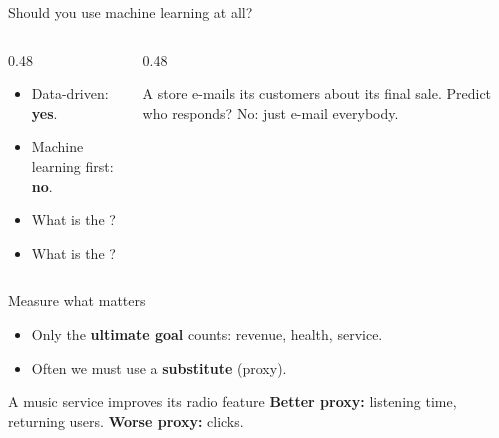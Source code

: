 \documentclass[handout,aspectratio=169,t,9pt]{beamer}
\begin{document}
\begin{frame}{Should you use machine learning at all?}
  \begin{columns}[T,onlytextwidth]
    \begin{column}{0.48\textwidth}
      \begin{itemize}
        \item Data-driven: \textbf{yes}.
        \item Machine learning first: \textbf{no}.
        \item What is the ?
        \item What is the ?
      \end{itemize}
    \end{column}
    \begin{column}{0.48\textwidth}
      \begin{example}
        A store e-mails its customers about its final sale.  Predict who
        responds?  No: just e-mail everybody.
      \end{example}
    \end{column}
  \end{columns}

\end{frame}

\begin{frame}{Measure what matters}
  \vspace{0.3cm}
  \begin{itemize}
    \item Only the \textbf{ultimate goal} counts: revenue, health, service.
    \item Often we must use a \textbf{substitute} (proxy).
  \end{itemize}

  \vspace{0.4cm}
  \begin{sibbox}{A music service improves its radio feature}
    \textbf{Better proxy:} listening time, returning users.
    \quad \textbf{Worse proxy:} clicks.
  \end{sibbox}

\end{frame}
\end{document}
